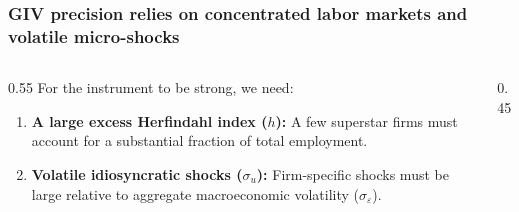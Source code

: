 \documentclass[aspectratio=169,11pt]{beamer}
\begin{document}
\begin{frame}[shrink=5]
    \frametitle{GIV precision relies on concentrated labor markets and volatile micro-shocks}

    \begin{columns}[T]
        \begin{column}{0.55\textwidth}
            \vspace{0.1cm}
            {\large
                For the instrument to be strong, we need:
            }

            \vspace{0.3cm}
            \begin{enumerate}
                \item \textbf{A large excess Herfindahl index ($h$):} A few superstar firms must account for a substantial fraction of total employment.
                      \vspace{0.2cm}
                \item \textbf{Volatile idiosyncratic shocks ($\sigma_u$):} Firm-specific shocks must be large relative to aggregate macroeconomic volatility ($\sigma_\varepsilon$).
            \end{enumerate}
        \end{column}

        \begin{column}{0.45\textwidth}
            \vspace{1.5cm}
        \end{column}
    \end{columns}

\end{frame}
\end{document}
